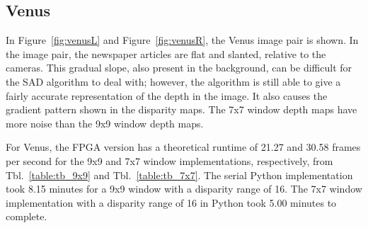 \subsection{Venus}
\label{sec:venus}

In Figure~\ref{fig:venusL} and Figure~\ref{fig:venusR}, the Venus image pair is shown. In the image pair, the newspaper articles are flat and slanted, relative to the cameras. This gradual slope, also present in the background, can be difficult for the SAD algorithm to deal with; however, the algorithm is still able to give a fairly accurate representation of the depth in the image. It also causes the gradient pattern shown in the disparity maps. The 7x7 window depth maps have more noise than the 9x9 window depth maps.

For Venus, the FPGA version has a theoretical runtime of 21.27 and 30.58 frames per second for the 9x9 and 7x7 window implementations, respectively, from Tbl.~\ref{table:tb_9x9} and Tbl.~\ref{table:tb_7x7}. The serial Python implementation took 8.15 minutes for a 9x9 window with a disparity range of 16. The 7x7 window implementation with a disparity range of 16 in Python took 5.00 minutes to complete.

